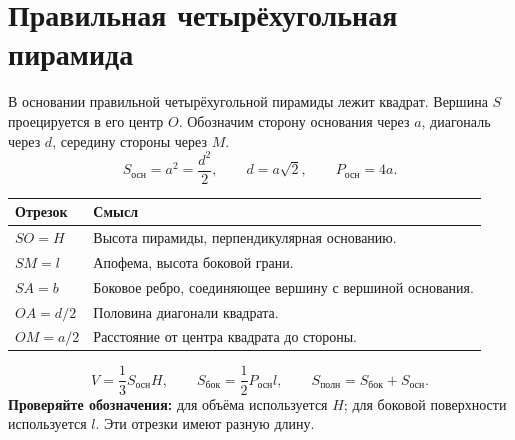 \documentclass[a4paper,12pt]{article}
\newcommand{\Sos}{S_{\text{осн}}}
\newcommand{\Sb}{S_{\text{бок}}}
\newcommand{\Sp}{S_{\text{полн}}}
\begin{document}
\section{Правильная четырёхугольная пирамида}
В основании правильной четырёхугольной пирамиды лежит квадрат. Вершина $S$ проецируется в его центр $O$. Обозначим сторону основания через $a$, диагональ через $d$, середину стороны через $M$.
\[
\Sos=a^2=\frac{d^2}{2},\qquad d=a\sqrt2,\qquad P_{\text{осн}}=4a.
\]
\begin{center}
\hspace{8mm}
\end{center}
\smallskip
\begin{tabularx}{\linewidth}{@{}lX@{}}
\toprule
Отрезок & Смысл \\\midrule
$SO=H$ & Высота пирамиды, перпендикулярная основанию.\\
$SM=l$ & Апофема, высота боковой грани.\\
$SA=b$ & Боковое ребро, соединяющее вершину с вершиной основания.\\
$OA=d/2$ & Половина диагонали квадрата.\\
$OM=a/2$ & Расстояние от центра квадрата до стороны.\\\bottomrule
\end{tabularx}
\[
V=\frac13\Sos H,\qquad \Sb=\frac12P_{\text{осн}}l,\qquad \Sp=\Sb+\Sos.
\]
\textbf{Проверяйте обозначения:} для объёма используется $H$; для боковой поверхности используется $l$. Эти отрезки имеют разную длину.
\clearpage
\end{document}
